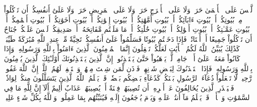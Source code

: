 لَّيۡسَ عَلَى ٱلۡأَعۡمَىٰ حَرَجٞ وَلَا عَلَى ٱلۡأَعۡرَجِ حَرَجٞ وَلَا عَلَى ٱلۡمَرِيضِ حَرَجٞ وَلَا عَلَىٰٓ أَنفُسِكُمۡ أَن تَأۡكُلُواْ مِنۢ بُيُوتِكُمۡ أَوۡ بُيُوتِ ءَابَآئِكُمۡ أَوۡ بُيُوتِ أُمَّهَٰتِكُمۡ أَوۡ بُيُوتِ إِخۡوَٰنِكُمۡ أَوۡ بُيُوتِ أَخَوَٰتِكُمۡ أَوۡ بُيُوتِ أَعۡمَٰمِكُمۡ أَوۡ بُيُوتِ عَمَّـٰتِكُمۡ أَوۡ بُيُوتِ أَخۡوَٰلِكُمۡ أَوۡ بُيُوتِ خَٰلَٰتِكُمۡ أَوۡ مَا مَلَكۡتُم مَّفَاتِحَهُۥٓ أَوۡ صَدِيقِكُمۡۚ لَيۡسَ عَلَيۡكُمۡ جُنَاحٌ أَن تَأۡكُلُواْ جَمِيعًا أَوۡ أَشۡتَاتٗاۚ فَإِذَا دَخَلۡتُم بُيُوتٗا فَسَلِّمُواْ عَلَىٰٓ أَنفُسِكُمۡ تَحِيَّةٗ مِّنۡ عِندِ ٱللَّهِ مُبَٰرَكَةٗ طَيِّبَةٗۚ كَذَٰلِكَ يُبَيِّنُ ٱللَّهُ لَكُمُ ٱلۡأٓيَٰتِ لَعَلَّكُمۡ تَعۡقِلُونَ
إِنَّمَا ٱلۡمُؤۡمِنُونَ ٱلَّذِينَ ءَامَنُواْ بِٱللَّهِ وَرَسُولِهِۦ وَإِذَا كَانُواْ مَعَهُۥ عَلَىٰٓ أَمۡرٖ جَامِعٖ لَّمۡ يَذۡهَبُواْ حَتَّىٰ يَسۡتَـٔۡذِنُوهُۚ إِنَّ ٱلَّذِينَ يَسۡتَـٔۡذِنُونَكَ أُوْلَـٰٓئِكَ ٱلَّذِينَ يُؤۡمِنُونَ بِٱللَّهِ وَرَسُولِهِۦۚ فَإِذَا ٱسۡتَـٔۡذَنُوكَ لِبَعۡضِ شَأۡنِهِمۡ فَأۡذَن لِّمَن شِئۡتَ مِنۡهُمۡ وَٱسۡتَغۡفِرۡ لَهُمُ ٱللَّهَۚ إِنَّ ٱللَّهَ غَفُورٞ رَّحِيمٞ
لَّا تَجۡعَلُواْ دُعَآءَ ٱلرَّسُولِ بَيۡنَكُمۡ كَدُعَآءِ بَعۡضِكُم بَعۡضٗاۚ قَدۡ يَعۡلَمُ ٱللَّهُ ٱلَّذِينَ يَتَسَلَّلُونَ مِنكُمۡ لِوَاذٗاۚ فَلۡيَحۡذَرِ ٱلَّذِينَ يُخَالِفُونَ عَنۡ أَمۡرِهِۦٓ أَن تُصِيبَهُمۡ فِتۡنَةٌ أَوۡ يُصِيبَهُمۡ عَذَابٌ أَلِيمٌ
أَلَآ إِنَّ لِلَّهِ مَا فِي ٱلسَّمَٰوَٰتِ وَٱلۡأَرۡضِۖ قَدۡ يَعۡلَمُ مَآ أَنتُمۡ عَلَيۡهِ وَيَوۡمَ يُرۡجَعُونَ إِلَيۡهِ فَيُنَبِّئُهُم بِمَا عَمِلُواْۗ وَٱللَّهُ بِكُلِّ شَيۡءٍ عَلِيمُۢ